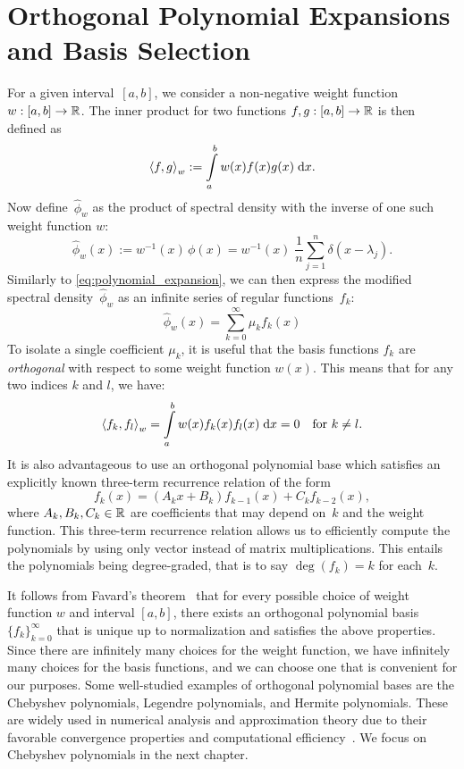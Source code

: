 \section{Orthogonal Polynomial Expansions and Basis Selection}
For a given interval~$[a, b]$, we consider a non-negative weight function $w: [a, b] \to \mathbb{R}$. The inner product for two functions $f, g: [a, b] \to \mathbb{R}$ is then defined as
\begin{equation} \label{eq:inner_product}
    \left \langle f, g \right \rangle_w := \int\limits_a^b w(x) f(x) g(x) \;\mathrm{d}x.
\end{equation}
Now define~$\hat{\phi}_w$ as the product of spectral density with the inverse of one such weight function $w$:
\begin{equation} \label{eq:phi_hat}
\hat{\phi}_w(x) := w^{-1}(x) \, \phi(x) =  w^{-1}(x) \; \frac{1}{n} \sum_{j = 1}^n \delta(x - \lambda_j).
\end{equation}
Similarly to \eqref{eq:polynomial_expansion}, we can then express the modified spectral density~$\hat{\phi}_w$ as an infinite series of regular functions~$f_k$:
\begin{equation} \label{eq:phi_hat_polynomial_expansion}
    \hat{\phi}_w(x) = \sum_{k = 0}^{\infty} \mu_k f_k(x)
\end{equation}
To isolate a single coefficient $\mu_k$, it is useful that the basis functions $f_k$ are \emph{orthogonal} with respect to some weight function $w(x)$. This means that for any two indices $k$ and $l$, we have:
\[
\left \langle f_k, f_l \right \rangle_w = \int \limits_{a}^b w(x) f_k(x) f_l(x) \;\mathrm{d}x = 0 \quad \text{for } k \neq l.
\]
It is also advantageous to use an orthogonal polynomial base which satisfies an explicitly known three-term recurrence relation of the form
\[
f_{k}(x) = (A_k x + B_k) f_{k-1}(x) + C_k f_{k-2}(x),
\]
where $A_k, B_k, C_k \in \mathbb{R}$ are coefficients that may depend on~$k$ and the weight function. This three-term recurrence relation allows us to efficiently compute the polynomials by using only vector instead of matrix multiplications. This entails the polynomials being degree-graded, that is to say $\deg(f_k) = k$ for each~$k$.

It follows from Favard's theorem~\cite[Thm.~2.1]{szego1975} that for every possible choice of weight function $w$ and interval $[a, b]$, there exists an orthogonal polynomial basis $\{f_k\}_{k=0}^{\infty}$ that is unique up to normalization and satisfies the above properties. Since there are infinitely many choices for the weight function, we have infinitely many choices for the basis functions, and we can choose one that is convenient for our purposes. Some well-studied examples of orthogonal polynomial bases are the Chebyshev polynomials, Legendre polynomials, and Hermite polynomials. These are widely used in numerical analysis and approximation theory due to their favorable convergence properties and computational efficiency~\cite{masonhandscomb}. We focus on Chebyshev polynomials in the next chapter.

